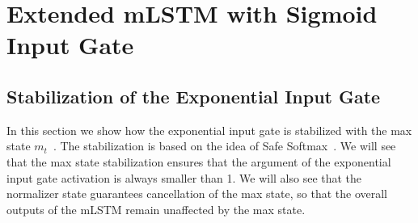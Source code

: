 \documentclass{article}
\begin{document}
    \newpage
    \section{Extended mLSTM with Sigmoid Input Gate}
    \label{app:extended_mlstmsigmoid}

    \subsection{Stabilization of the Exponential Input Gate}
    \label{app:stabilization_exponential}
    In this section we show how the exponential input gate is stabilized with the max state $m_t$~\citep{beck:24xlstm}.
    The stabilization is based on the idea of Safe Softmax~\citep{Milakov:18online}.
    We will see that the max state stabilization ensures that the argument of the exponential input gate activation is always smaller than 1.
    We will also see that the normalizer state guarantees cancellation of the max state, so that the overall outputs of the mLSTM remain unaffected by the max state.
\end{document}
